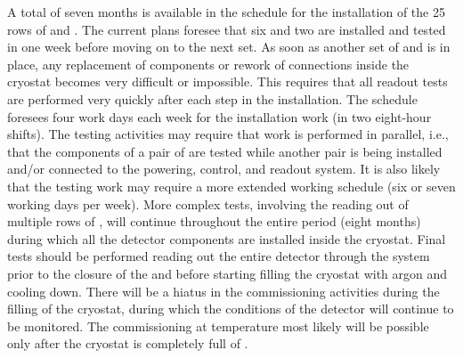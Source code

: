 A total of seven months is available in the schedule for the installation
of the \num{25} rows of  and . The current plans foresee that six 
and two  are installed and
tested in one week before moving on to the next set. As soon as another
set of  and  is in place, any replacement of components or rework
of connections inside the cryostat becomes very difficult or impossible.
This requires that all readout tests are performed very quickly after
each step in the installation. The schedule foresees four work days each
week for the installation work (in two eight-hour shifts). The testing
activities may require that work is performed in parallel, i.e., that
the  components of a pair of  are tested while another pair is
being installed and/or connected to the powering, control, and readout
system. It is also likely that the testing work may require a more
extended working schedule (six or seven working days per week). More
complex tests, involving the reading out of multiple rows of , will continue
throughout the entire period (eight months) during which all the detector
components are installed inside the cryostat. Final tests should be
performed reading out the entire detector through the  system
prior to the closure of the  and before
starting filling the cryostat with argon and cooling down. There will be a hiatus
in the commissioning activities during the filling of the cryostat, during
which the conditions of the detector will continue to be monitored. The
commissioning at \lar temperature most likely will be possible only
after the cryostat is completely full of \lar.
